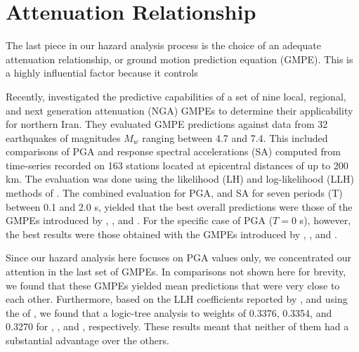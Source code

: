 
\section{Attenuation Relationship}

The last piece in our hazard analysis process is the choice of an adequate attenuation relationship, or ground motion prediction equation (GMPE). This is a highly influential factor because it controls 

Recently, \citet{Zafarani2014} investigated the predictive capabilities of a set of nine local, regional, and next generation attenuation (NGA) GMPEs to determine their applicability for northern Iran. They evaluated GMPE predictions against data from 32 earthquakes of magnitudes $M_w$ ranging between 4.7 and 7.4. This included comparisons of PGA and response spectral accelerations (SA) computed from time-series recorded on 163 stations located at epicentral distances of up to 200 km. The evaluation was done using the likelihood (LH) and log-likelihood (LLH) methods of \citet{Scherbaum_2004_BSSA, Scherbaum_2009_BSSA}. The combined evaluation for PGA, and SA for seven periods (T) between 0.1 and 2.0 s, yielded that the best overall predictions were those of the GMPEs introduced by \citet{Ghasemi_2009_JS}, \citet{Abrahamson_2008_ES}, and \citet{Chiou2008}. For the specific case of PGA ($T=0$ s), however, the best results were those obtained with the GMPEs introduced by \citet{Kalkan2004}, \citet{Chiou2008}, and \citet{Boore2008}.

Since our hazard analysis here focuses on PGA values only, we concentrated our attention in the last set of GMPEs. In comparisons not shown here for brevity, we found that these GMPEs yielded mean predictions that were very close to each other. Furthermore, based on the LLH coefficients reported by \citet{Zafarani2014}, and using the  of \citet{Scherbaum_2009_BSSA}, we found that a logic-tree analysis  to weights of 0.3376, 0.3354, and 0.3270 for \citet{Kalkan2004}, \citet{Chiou2008}, and \citet{Boore2008}, respectively. These results meant that neither of them had a substantial advantage over the others. 

